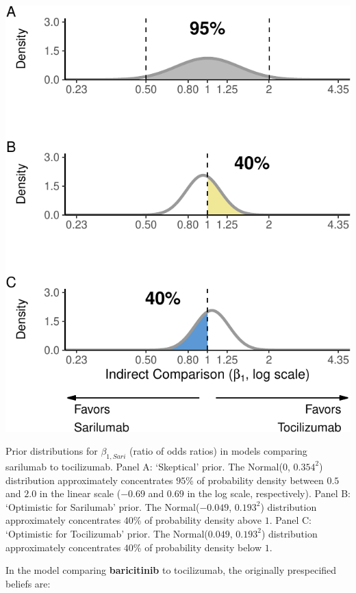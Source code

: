 \documentclass[
  12pt,
]{article}
\begin{document}
\begin{center}\includegraphics{supplementary_material_files/figure-latex/all priors sari meta regressions-1} \end{center}

Prior distributions for \(\beta_{1, Sari}\) (ratio of odds ratios) in
models comparing sarilumab to tocilizumab. Panel A: `Skeptical' prior.
The Normal(\(0\), \(0.354^2\)) distribution approximately concentrates
\(95\)\% of probability density between \(0.5\) and \(2.0\) in the
linear scale (\(-0.69\) and \(0.69\) in the log scale, respectively).
Panel B: `Optimistic for Sarilumab' prior. The Normal(\(-0.049\),
\(0.193^2\)) distribution approximately concentrates \(40\)\% of
probability density above \(1\). Panel C: `Optimistic for Tocilizumab'
prior. The Normal(\(0.049\), \(0.193^2\)) distribution approximately
concentrates \(40\)\% of probability density below \(1\).

In the model comparing \textbf{baricitinib} to tocilizumab, the
originally prespecified beliefs are:
\end{document}
